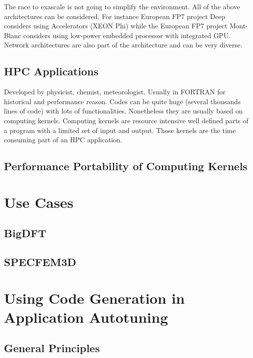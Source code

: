 \documentclass[review]{elsarticle}
\begin{document}
The race to exascale is not going to simplify the environment. All of the
above architectures can be considered. For instance European FP7 project Deep
considers using Accelerators (XEON Phi) while the European FP7 project
Mont-Blanc considers using low-power embedded processor with integrated
GPU. Network architectures are also part of the architecture and can be
very diverse.

  \subsection{HPC Applications}

Developed by physicist, chemist, meteorologist. Usually in FORTRAN for
historical and performance reason. Codes can be quite huge (several
thousands lines of code) with lots of functionalities. Nonetheless they are
usually based on computing kernels. Computing kernels are resource
intensive well defined parts of a program with a limited set of input and
output. Those kernels are the time consuming part of an HPC application.



  \subsection{Performance Portability of Computing Kernels}




\section{Use Cases}

  \subsection{BigDFT}


  \subsection{SPECFEM3D}


\section{Using Code Generation in Application Autotuning}

  \subsection{General Principles}
\end{document}
